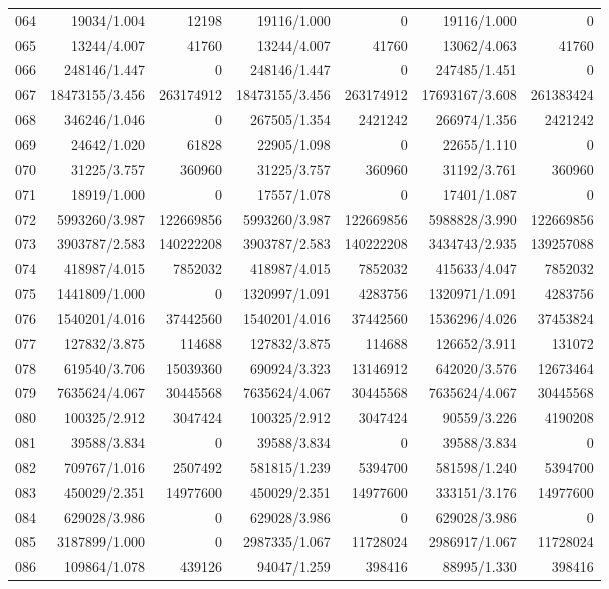 \begin{longtable}{crrrrrr}
064 & 19034/1.004 & 12198 & 19116/1.000 & 0 & 19116/1.000 & 0 \\
065 & 13244/4.007 & 41760 & 13244/4.007 & 41760 & 13062/4.063 & 41760 \\
066 & 248146/1.447 & 0 & 248146/1.447 & 0 & 247485/1.451 & 0 \\
067 & 18473155/3.456 & 263174912 & 18473155/3.456 & 263174912 & 17693167/3.608 & 261383424 \\
068 & 346246/1.046 & 0 & 267505/1.354 & 2421242 & 266974/1.356 & 2421242 \\
069 & 24642/1.020 & 61828 & 22905/1.098 & 0 & 22655/1.110 & 0 \\
070 & 31225/3.757 & 360960 & 31225/3.757 & 360960 & 31192/3.761 & 360960 \\
071 & 18919/1.000 & 0 & 17557/1.078 & 0 & 17401/1.087 & 0 \\
072 & 5993260/3.987 & 122669856 & 5993260/3.987 & 122669856 & 5988828/3.990 & 122669856 \\
073 & 3903787/2.583 & 140222208 & 3903787/2.583 & 140222208 & 3434743/2.935 & 139257088 \\
074 & 418987/4.015 & 7852032 & 418987/4.015 & 7852032 & 415633/4.047 & 7852032 \\
075 & 1441809/1.000 & 0 & 1320997/1.091 & 4283756 & 1320971/1.091 & 4283756 \\
076 & 1540201/4.016 & 37442560 & 1540201/4.016 & 37442560 & 1536296/4.026 & 37453824 \\
077 & 127832/3.875 & 114688 & 127832/3.875 & 114688 & 126652/3.911 & 131072 \\
078 & 619540/3.706 & 15039360 & 690924/3.323 & 13146912 & 642020/3.576 & 12673464 \\
079 & 7635624/4.067 & 30445568 & 7635624/4.067 & 30445568 & 7635624/4.067 & 30445568 \\
080 & 100325/2.912 & 3047424 & 100325/2.912 & 3047424 & 90559/3.226 & 4190208 \\
081 & 39588/3.834 & 0 & 39588/3.834 & 0 & 39588/3.834 & 0 \\
082 & 709767/1.016 & 2507492 & 581815/1.239 & 5394700 & 581598/1.240 & 5394700 \\
083 & 450029/2.351 & 14977600 & 450029/2.351 & 14977600 & 333151/3.176 & 14977600 \\
084 & 629028/3.986 & 0 & 629028/3.986 & 0 & 629028/3.986 & 0 \\
085 & 3187899/1.000 & 0 & 2987335/1.067 & 11728024 & 2986917/1.067 & 11728024 \\
086 & 109864/1.078 & 439126 & 94047/1.259 & 398416 & 88995/1.330 & 398416 \\

\end{longtable}

